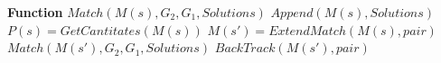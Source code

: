 \documentclass{article}
\begin{document}
\begin{CJK}{UTF8}{gbsn}
    \begin{algorithm}
            \begin{algorithmic}[1]
            \State \textbf{Function} $Match(M(s),G_2,G_1,Solutions)$
                    \State $Append(M(s),Solutions)$
                \Else
                    \State $P(s)=GetCantitates(M(s))$
                            \State $M(s')=ExtendMatch(M(s),pair)$
                            \State $Match(M(s'),G_2,G_1,Solutions)$
                            \State $BackTrack(M(s'),pair)$
                        \EndIf
                    \EndFor
                \EndIf                            
        \end{algorithmic}
    \end{algorithm}

    \end{CJK}
\end{document}
